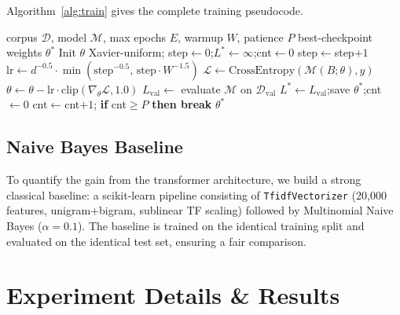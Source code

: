 \documentclass[sigconf, nonacm]{acmart}
\begin{document}
Algorithm~\ref{alg:train} gives the complete training pseudocode.

\begin{algorithm}[h]\small
\caption{PhishFormer Training (Noam Schedule + Early Stopping)}
\label{alg:train}
\begin{algorithmic}[1]
\Require corpus $\mathcal{D}$, model $\mathcal{M}$,
         max epochs $E$, warmup $W$, patience $P$
\Ensure best-checkpoint weights $\theta^*$
\State Init $\theta$ Xavier-uniform;\enspace
       step$\gets0$;\enspace $L^*\gets\infty$;\enspace cnt$\gets0$
    \State step$\gets$step$+1$
    \State $\mathrm{lr}\gets d^{-0.5}\cdot
           \min(\mathrm{step}^{-0.5},\,\mathrm{step}{\cdot}W^{-1.5})$
    \State $\mathcal{L}\gets\mathrm{CrossEntropy}(\mathcal{M}(B;\theta),y)$
    \State $\theta\gets\theta-\mathrm{lr}\cdot
           \mathrm{clip}(\nabla_\theta\mathcal{L},1.0)$
           \hfill{}
  \EndFor
  \State $L_\text{val}\gets$ evaluate $\mathcal{M}$ on
         $\mathcal{D}_\text{val}$
  \enspace
    $L^*\gets L_\text{val}$;\enspace save $\theta^*$;\enspace cnt$\gets0$
  \Else\enspace cnt$\gets$cnt$+1$;\enspace
    \textbf{if} cnt$\geq P$ \textbf{then break}
  \EndIf
\EndFor
\State \Return $\theta^*$
\end{algorithmic}
\end{algorithm}

\subsection{Naive Bayes Baseline}

To quantify the gain from the transformer architecture, we build a
strong classical baseline: a scikit-learn pipeline consisting of
\texttt{TfidfVectorizer} (20{,}000 features, unigram+bigram, sublinear
TF scaling) followed by Multinomial Naive Bayes ($\alpha=0.1$).
The baseline is trained on the identical training split and evaluated
on the identical test set, ensuring a fair comparison.

\section{Experiment Details \& Results}
\end{document}
